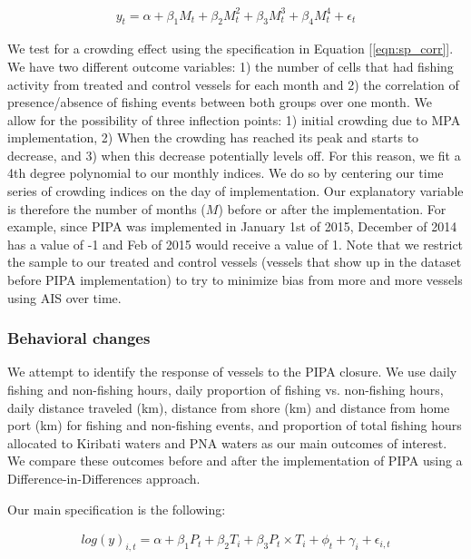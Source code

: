 \documentclass[9p,twocolumn,twoside,lineno]{pnas-new}
\begin{document}
\begin{figure}[H]
	\begin{align}
	y_t = \alpha + \beta_1 M_t + \beta_2 M_t^2 + \beta_3 M_t^3 + \beta_4 M_t ^4 + \epsilon_t
	\label{eqn:sp_corr}
	\end{align}
\end{figure}

We test for a crowding effect using the specification in Equation [\ref{eqn:sp_corr}]. We have two different outcome variables:
1) the number of cells that had fishing activity from treated and control vessels for each month and 2) the correlation of presence/absence of fishing events between both groups over one month. 
We allow for the possibility of three inflection points: 1) initial crowding due to MPA implementation, 2) When the crowding has reached its peak and starts to decrease, and 3) when this decrease potentially levels off. For this reason, we fit a 4th degree polynomial to our monthly indices. We do so by centering our time series of crowding indices on the day of implementation. Our explanatory variable is therefore the number of months ($M$) before or after the implementation. For example, since PIPA was implemented in January 1st of 2015, December of 2014 has a value of -1 and Feb of 2015 would receive a value of 1. Note that we restrict the sample to our treated and control vessels (vessels that show up in the dataset before PIPA implementation) to try to minimize bias from more and more vessels using AIS over time.

\subsubsection{Behavioral changes}

We attempt to identify the response of vessels to the PIPA closure. We use daily fishing and non-fishing hours, daily proportion of fishing vs. non-fishing hours, daily distance traveled (km), distance from shore (km) and distance from home port (km) for fishing and non-fishing events, and proportion of total fishing hours allocated to Kiribati waters and PNA waters as our main outcomes of interest. We compare these outcomes before and after the implementation of PIPA using a Difference-in-Differences approach. 

Our main specification is the following:

\begin{figure}[H]
\begin{align}
log(y)_{i,t} = \alpha + \beta_1 P_t + \beta_2 T_i + \beta_3 P_t \times T_i + \phi_t + \gamma_i + \epsilon_{i,t}
\label{eqn:did}
\end{align}
\end{figure}
\end{document}
